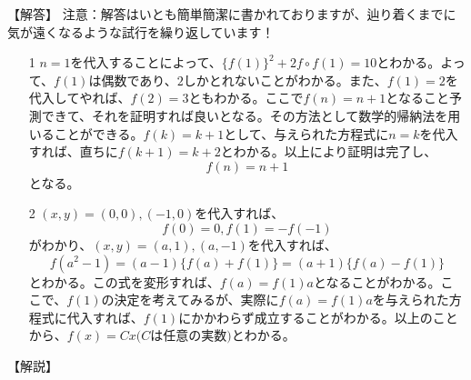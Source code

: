 \documentclass[a4paper,fleqn,dvipdfmx]{jsarticle}
\begin{document}
\begin{flushleft}
【解答】
注意：解答はいとも簡単簡潔に書かれておりますが、辿り着くまでに気が遠くなるような試行を繰り返しています！
\end{flushleft}

\begin{itemize}
    \item [1] 
    $n=1$を代入することによって、$\{f(1)\}^2+2f\circ f(1)=10$とわかる。よって、$f(1)$は偶数であり、$2$しかとれないことがわかる。また、$f(1)=2$を代入してやれば、$f(2)=3$ともわかる。ここで$f(n)=n+1$となること予測できて、それを証明すれば良いとなる。その方法として数学的帰納法を用いることができる。$f(k)=k+1$として、与えられた方程式に$n=k$を代入すれば、直ちに$f(k+1)=k+2$とわかる。以上により証明は完了し、$$f(n)=n+1$$となる。
    
    \item [2]
    $(x,y)=(0,0),(-1,0)$を代入すれば、
    $$f(0)=0,f(1)=-f(-1)$$
    がわかり、$(x,y)=(a,1),(a,-1)$を代入すれば、
    $$f(a^2-1)=(a-1)\{f(a)+f(1)\}=(a+1)\{f(a)-f(1)\}$$
    とわかる。この式を変形すれば、$f(a)=f(1)a$となることがわかる。ここで、$f(1)$の決定を考えてみるが、実際に$f(a)=f(1)a$を与えられた方程式に代入すれば、$f(1)$にかかわらず成立することがわかる。以上のことから、$f(x)=Cx(C$は任意の実数$)$とわかる。
    
\end{itemize}


\begin{flushleft}
【解説】
\end{flushleft}
\end{document}
